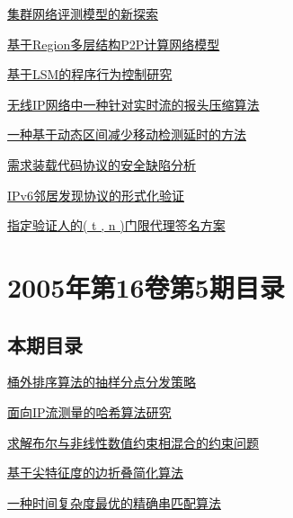 \documentclass[a4paper]{article}
\begin{document}
\href{http://www.jos.org.cn/ch/reader/download_pdf.aspx?file_no=20050612&year_id=2005&quarter_id=6&falg=1}{集群网络评测模型的新探索}

\href{http://www.jos.org.cn/ch/reader/download_pdf.aspx?file_no=20050613&year_id=2005&quarter_id=6&falg=1}{基于Region多层结构P2P计算网络模型}

\href{http://www.jos.org.cn/ch/reader/download_pdf.aspx?file_no=20050614&year_id=2005&quarter_id=6&falg=1}{基于LSM的程序行为控制研究}

\href{http://www.jos.org.cn/ch/reader/download_pdf.aspx?file_no=20050615&year_id=2005&quarter_id=6&falg=1}{无线IP网络中一种针对实时流的报头压缩算法}

\href{http://www.jos.org.cn/ch/reader/download_pdf.aspx?file_no=20050616&year_id=2005&quarter_id=6&falg=1}{一种基于动态区间减少移动检测延时的方法}

\href{http://www.jos.org.cn/ch/reader/download_pdf.aspx?file_no=20050617&year_id=2005&quarter_id=6&falg=1}{需求装载代码协议的安全缺陷分析}

\href{http://www.jos.org.cn/ch/reader/download_pdf.aspx?file_no=20050618&year_id=2005&quarter_id=6&falg=1}{IPv6邻居发现协议的形式化验证}

\href{http://www.jos.org.cn/ch/reader/download_pdf.aspx?file_no=20050619&year_id=2005&quarter_id=6&falg=1}{指定验证人的( t , n )门限代理签名方案}


\section{\textbf{2005年第16卷第5期目录}}
\subsection{本期目录}
\href{http://www.jos.org.cn/ch/reader/download_pdf.aspx?file_no=20050501&year_id=2005&quarter_id=5&falg=1}{桶外排序算法的抽样分点分发策略}

\href{http://www.jos.org.cn/ch/reader/download_pdf.aspx?file_no=20050502&year_id=2005&quarter_id=5&falg=1}{面向IP流测量的哈希算法研究}

\href{http://www.jos.org.cn/ch/reader/download_pdf.aspx?file_no=20050503&year_id=2005&quarter_id=5&falg=1}{求解布尔与非线性数值约束相混合的约束问题}

\href{http://www.jos.org.cn/ch/reader/download_pdf.aspx?file_no=20050504&year_id=2005&quarter_id=5&falg=1}{基于尖特征度的边折叠简化算法}

\href{http://www.jos.org.cn/ch/reader/download_pdf.aspx?file_no=20050505&year_id=2005&quarter_id=5&falg=1}{一种时间复杂度最优的精确串匹配算法}
\end{document}
